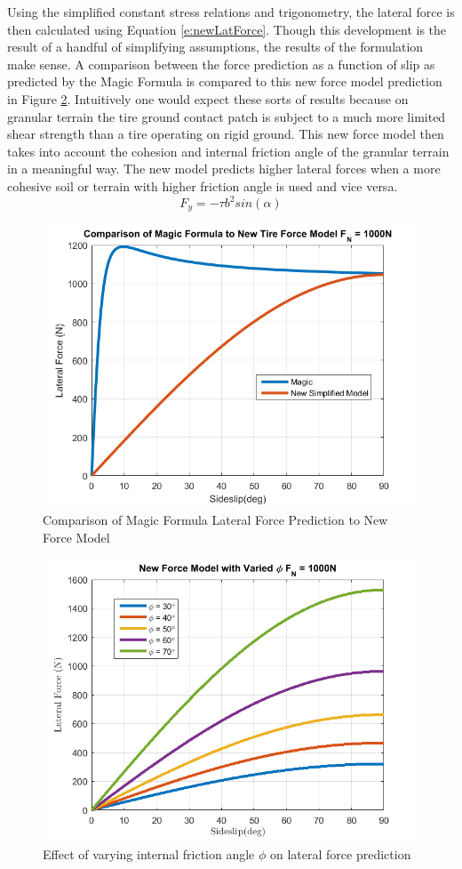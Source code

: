\documentclass[12pt,onecolumn]{report}
\begin{document}
Using the simplified constant stress relations and trigonometry, the lateral force is then calculated using Equation \ref{e:newLatForce}. Though this development is the result of a handful of simplifying assumptions, the results of the formulation make sense. A comparison between the force prediction as a function of slip as predicted by the Magic Formula is compared to this new force model prediction in Figure \ref{fig:newForceComparison}. Intuitively one would expect these sorts of results because on granular terrain the tire ground contact patch is subject to a much more limited shear strength than a tire operating on rigid ground. This new force model then takes into account the cohesion and internal friction angle of the granular terrain in a meaningful way. The new model predicts higher lateral forces when a more cohesive soil or terrain with higher friction angle is used and vice versa. 
%
\begin{equation}\label{e:newLatForce}
F_y = -\tau b^2 sin\left(\alpha\right)
\end{equation}

\begin{figure}
	\centering
	\includegraphics[width=0.8\columnwidth]{Figs/forceComparison.png}
	\caption{\small Comparison of Magic Formula Lateral Force Prediction to New Force Model}  
	\label{fig:newForceComparison}
\end{figure}

\begin{figure}
	\centering
	\includegraphics[width=0.8\columnwidth]{Figs/variedPhi.png}
	\caption{\small Effect of varying internal friction angle $\phi$ on lateral force prediction}  
	\label{fig:newForceComparison}
\end{figure}
\end{document}
